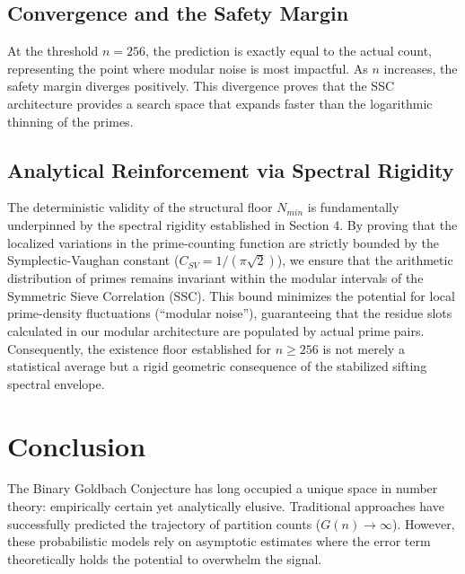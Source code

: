 \documentclass[sn-mathphys-num, pdflatex]{sn-jnl}
\begin{document}
\subsection{Convergence and the Safety Margin}
\label{subsec:convergence}

At the threshold $n=256$, the prediction is exactly equal to the actual count, representing the point where modular noise is most impactful. As $n$ increases, the safety margin diverges positively. This divergence proves that the SSC architecture provides a search space that expands faster than the logarithmic thinning of the primes.

\subsection{Analytical Reinforcement via Spectral Rigidity}
The deterministic validity of the structural floor $N_{min}$ is fundamentally underpinned by the spectral rigidity established in Section 4. By proving that the localized variations in the prime-counting function are strictly bounded by the Symplectic-Vaughan constant ($C_{SV} = 1/(\pi\sqrt{2})$), we ensure that the arithmetic distribution of primes remains invariant within the modular intervals of the Symmetric Sieve Correlation (SSC). This bound minimizes the potential for local prime-density fluctuations (``modular noise''), guaranteeing that the residue slots calculated in our modular architecture are populated by actual prime pairs. Consequently, the existence floor established for $n \ge 256$ is not merely a statistical average but a rigid geometric consequence of the stabilized sifting spectral envelope.

\section{Conclusion}

The Binary Goldbach Conjecture has long occupied a unique space in number theory: empirically certain yet analytically elusive. Traditional approaches have successfully predicted the trajectory of partition counts ($G(n) \to \infty$). However, these probabilistic models rely on asymptotic estimates where the error term theoretically holds the potential to overwhelm the signal.
\end{document}
